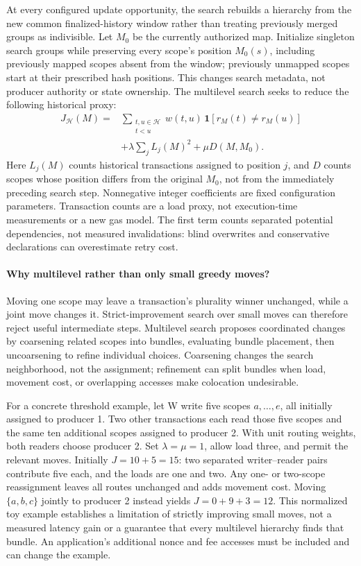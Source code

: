 At every configured update opportunity, the search rebuilds a hierarchy from the new common finalized-history window rather than treating previously merged groups as indivisible. Let \(M_0\) be the currently authorized map. Initialize singleton search groups while preserving every scope's position \(M_0(s)\), including previously mapped scopes absent from the window; previously unmapped scopes start at their prescribed hash positions. This changes search metadata, not producer authority or state ownership. The multilevel search seeks to reduce the following historical proxy:
\begin{equation}
\begin{aligned}
 J_{\mathcal H}(M)={}&
 \sum_{\substack{t,u\in\mathcal H\\t<u}}w(t,u)\,\mathbf{1}[r_M(t)\ne r_M(u)]\\
 &+\lambda\sum_j L_j(M)^2+\mu D(M,M_0).
\end{aligned}
\label{eq:placement-cost}
\end{equation}
Here \(L_j(M)\) counts historical transactions assigned to position \(j\), and \(D\) counts scopes whose position differs from the original \(M_0\), not from the immediately preceding search step. Nonnegative integer coefficients are fixed configuration parameters. Transaction counts are a load proxy, not execution-time measurements or a new gas model. The first term counts separated potential dependencies, not measured invalidations: blind overwrites and conservative declarations can overestimate retry cost.

\paragraph{Why multilevel rather than only small greedy moves?}
Moving one scope may leave a transaction's plurality winner unchanged, while a joint move changes it. Strict-improvement search over small moves can therefore reject useful intermediate steps. Multilevel search proposes coordinated changes by coarsening related scopes into bundles, evaluating bundle placement, then uncoarsening to refine individual choices. Coarsening changes the search neighborhood, not the assignment; refinement can split bundles when load, movement cost, or overlapping accesses make colocation undesirable.

For a concrete threshold example, let W write five scopes \(a,\ldots,e\), all initially assigned to producer 1. Two other transactions each read those five scopes and the same ten additional scopes assigned to producer 2. With unit routing weights, both readers choose producer 2. Set \(\lambda=\mu=1\), allow load three, and permit the relevant moves. Initially \(J=10+5=15\): two separated writer--reader pairs contribute five each, and the loads are one and two. Any one- or two-scope reassignment leaves all routes unchanged and adds movement cost. Moving \(\{a,b,c\}\) jointly to producer 2 instead yields \(J=0+9+3=12\). This normalized toy example establishes a limitation of strictly improving small moves, not a measured latency gain or a guarantee that every multilevel hierarchy finds that bundle. An application's additional nonce and fee accesses must be included and can change the example.

